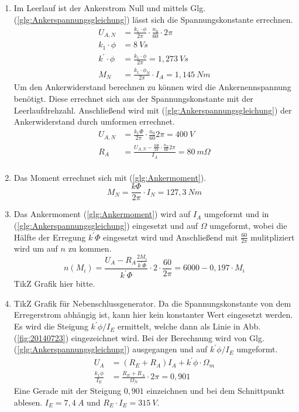 \begin{solution}
\begin{enumerate}
\item Im Leerlauf ist der Ankerstrom Null und mittels Glg.(\ref{glg:Ankerspannungsgleichung}) lässt sich die Spannungskonstante errechnen.
\begin{align}
U_{A,N} &= \frac{k_1 \cdot \phi}{2 \pi} \cdot \frac{n_0}{60} \cdot 2 \pi\\
k_1 \cdot \phi &= 8~Vs\\
k^{'} \cdot \phi &= \frac{k_1 \cdot \phi}{2 \pi} = 1,273~Vs\\
M_N &= \frac{k_1 \cdot \phi_N}{2 \pi} \cdot I_A = 1,145~Nm
\end{align}
Um den Ankerwiderstand berechnen zu können wird die Ankernennspannung benötigt. Diese errechnet sich aus der Spannungskonstante mit der Leerlaufdrehzahl. Anschließend wird mit (\ref{glg:Ankerspannungsgleichung}) der Ankerwiderstand durch umformen errechnet.\\
\begin{align}
U_{A,N} &= \frac{k_1 \Phi}{2 \pi} \cdot \frac{n_0}{60} 2 \pi = 400~V\\
R_A &= \frac{U_{A,N} - \frac{k \Phi}{2 \pi} \cdot \frac{n_N}{60} 2 \pi}{I_A}=80~m \Omega\\
\end{align}
\item Das Moment errechnet sich mit (\ref{glg:Ankermoment}).\\
\begin{equation}
M_N=\frac{k \Phi}{2 \pi} \cdot I_N =127,3~Nm
\end{equation}
\item Das Ankermoment (\ref{glg:Ankermoment}) wird auf $I_A$ umgeformt und in (\ref{glg:Ankerspannungsgleichung}) eingesetzt und auf $\Omega$ umgeformt, wobei die Hälfte der Erregung $k^{'} \Phi$ eingesetzt wird und Anschließend mit $\frac{60}{2 \pi}$ mulitpliziert wird um auf $n$ zu kommen.
\begin{equation}
n(M_i) = \frac{U_A - R_A \frac{2 M_i}{k^{'} \Phi}}{k^{'}\Phi} \cdot 2 \cdot \frac{60}{2 \pi} =6000-0,197 \cdot M_i
\end{equation}
TikZ Grafik hier bitte.
\item TikZ Grafik für Nebenschlussgenerator. Da die Spannungskonstante von dem Erregerstrom abhängig ist, kann hier kein konstanter Wert eingesetzt werden. Es wird die Steigung $k^{'} \phi/I_E$ ermittelt, welche dann als Linie in Abb.(\ref{fig:20140723}) eingezeichnet wird. Bei der Berechnung wird von Glg.(\ref{glg:Ankerspannungsgleichung}) ausgegangen und auf $k^{'} \phi/I_E$ umgeformt.
\begin{align}
U_A &= (R_E +R_A)  I_A  + k^{'} \phi \cdot \Omega_m\\
\frac{k_1 \phi}{I_E} &= \frac{R_E +R_A}{\Omega_N}\cdot 2 \pi = 0,901
\end{align}
Eine Gerade mit der Steigung $0,901$ einzeichnen und bei dem Schnittpunkt ablesen. $I_E= 7,4~A$ und $R_E \cdot I_E = 315~V$.
\end{enumerate}
\end{solution}